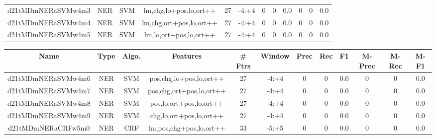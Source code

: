 \documentclass[a4paper]{article}
\begin{document}
\begin{landscape}
\begin{center}
\begin{tabular}{ |c|c|c|c|c|c|c|c|c|c|c|c|}
 
 	
 	\small{ d21tMDmNERaSVMw4m3 } & \small{ NER} & \small{  SVM }  & lm,chg,lo+pos,lo,ort++  &  27 &  \small{  -4:+4 }  &  0 & 0 & 0.0  &  0 & 0 & 0.0 \\
 	

 
 	
 	\small{ d21tMDmNERaSVMw4m4 } & \small{ NER} & \small{  SVM }  & lm,chg,ort+pos,lo,ort++  &  27 &  \small{  -4:+4 }  &  0 & 0 & 0.0  &  0 & 0 & 0.0 \\
 	

 
 	
 	\small{ d21tMDmNERaSVMw4m5 } & \small{ NER} & \small{  SVM }  & lm,lo,ort+pos,lo,ort++  &  27 &  \small{  -4:+4 }  &  0 & 0 & 0.0  &  0 & 0 & 0.0 \\
 	
 \hline
\end{tabular}
\end{center}




\begin{center}
\begin{tabular}{ |c|c|c|c|c|c|c|c|c|c|c|c|} 
 \hline
 	Name & Type & Algo. & Features & \# Ftrs & Window & Prec & Rec & F1 & M-Prec & M-Rec & M-F1\\
 \hline

 	

 
 	
 	\small{ d21tMDmNERaSVMw4m6 } & \small{ NER} & \small{  SVM }  & pos,chg,lo+pos,lo,ort++  &  27 &  \small{  -4:+4 }  &  0 & 0 & 0.0  &  0 & 0 & 0.0 \\
 	

 
 	
 	\small{ d21tMDmNERaSVMw4m7 } & \small{ NER} & \small{  SVM }  & pos,chg,ort+pos,lo,ort++  &  27 &  \small{  -4:+4 }  &  0 & 0 & 0.0  &  0 & 0 & 0.0 \\
 	

 
 	
 	\small{ d21tMDmNERaSVMw4m8 } & \small{ NER} & \small{  SVM }  & pos,lo,ort+pos,lo,ort++  &  27 &  \small{  -4:+4 }  &  0 & 0 & 0.0  &  0 & 0 & 0.0 \\
 	

 
 	
 	\small{ d21tMDmNERaSVMw4m9 } & \small{ NER} & \small{  SVM }  & chg,lo,ort+pos,lo,ort++  &  27 &  \small{  -4:+4 }  &  0 & 0 & 0.0  &  0 & 0 & 0.0 \\
 	

 
 	
 	\small{ d21tMDmNERaCRFw5m0 } & \small{ NER} & \small{  CRF }  & lm,pos,chg+pos,lo,ort++  &  33 &  \small{  -5:+5 }  &  0 & 0 & 0.0  &  0 & 0 & 0.0 \\
 	


\end{tabular}
\end{center}
\end{landscape}
\end{document}
